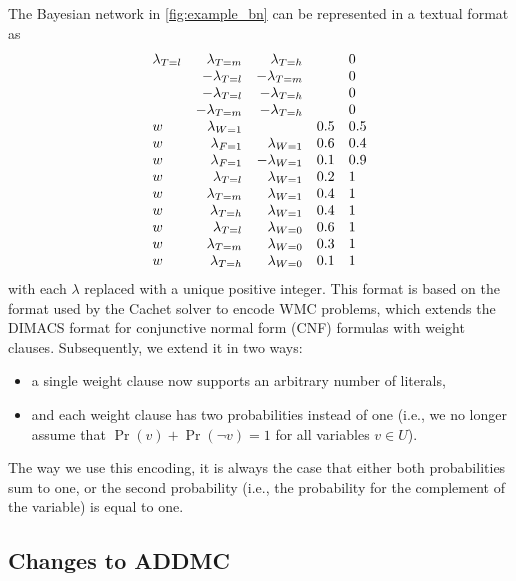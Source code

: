 \documentclass{article}
\theoremstyle{definition}
\theoremstyle{remark}
\begin{document}
The Bayesian network in \cref{fig:example_bn} can be represented in a textual
format as
\[
  \begin{array}{l r r l l}
    \lambda\sb{T=l} &\lambda\sb{T=m} &\lambda\sb{T=h} & &0 \\
                    &-\lambda\sb{T=l} &-\lambda\sb{T=m} & &0 \\
                    &-\lambda\sb{T=l} &-\lambda\sb{T=h} & &0 \\
                    &-\lambda\sb{T=m} &-\lambda\sb{T=h} & &0 \\
    w &\lambda\sb{W=1} & &0.5 &0.5 \\
    w &\lambda\sb{F=1} &\lambda\sb{W=1} &0.6 &0.4 \\
    w &\lambda\sb{F=1} &-\lambda\sb{W=1} &0.1 &0.9 \\
    w &\lambda\sb{T=l} &\lambda\sb{W=1} &0.2 &1 \\
    w &\lambda\sb{T=m} &\lambda\sb{W=1} &0.4 &1 \\
    w &\lambda\sb{T=h} &\lambda\sb{W=1} &0.4 &1 \\
    w &\lambda\sb{T=l} &\lambda\sb{W=0} &0.6 &1 \\
    w &\lambda\sb{T=m} &\lambda\sb{W=0} &0.3 &1 \\
    w &\lambda\sb{T=h} &\lambda\sb{W=0} &0.1 &1
  \end{array}
\]
with each $\lambda$ replaced with a unique positive integer. This format is
based on the format used by the Cachet solver \cite{DBLP:conf/sat/SangBBKP04}
to encode WMC problems, which extends the DIMACS format for conjunctive normal
form (CNF) formulas with weight clauses. Subsequently, we extend it in two
ways:
\begin{itemize}
\item a single weight clause now supports an arbitrary number of literals,
\item and each weight clause has two probabilities instead of one (i.e., we no
  longer assume that $\Pr(v) + \Pr(\neg v) = 1$ for all variables $v \in U$).
\end{itemize}
The way we use this encoding, it is always the case that either both
probabilities sum to one, or the second probability (i.e., the probability for
the complement of the variable) is equal to one.

\subsection{Changes to ADDMC}
\end{document}

